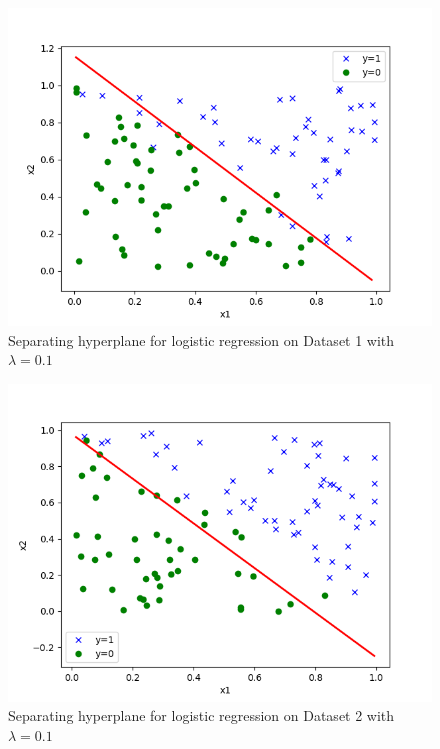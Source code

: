 \begin{answer}
  \begin{answer}
    \begin{figure}[H]
      \centering
      \vspace{2mm}
      \includegraphics[width=0.65\linewidth]{../src/logreg_stability/logreg_pred_a_reg.png}
          \caption{Separating hyperplane for logistic regression on Dataset 1 with $\lambda = 0.1$}
    \end{figure}

    \begin{figure}[H]
    \centering
    \vspace{2mm}
    \includegraphics[width=0.65\linewidth]{../src/logreg_stability/logreg_pred_b_reg.png}
    \caption{Separating hyperplane for logistic regression on Dataset 2 with $\lambda = 0.1$}
    \end{figure}

  \end{answer}
\end{answer}
